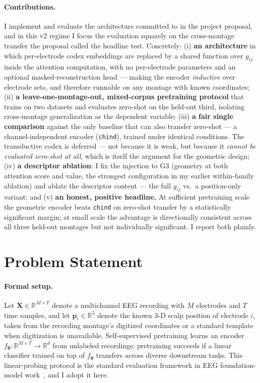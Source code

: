 \documentclass[11pt]{article}
\begin{document}
\paragraph{Contributions.}
I implement and evaluate the architecture committed to in the project
proposal, and in this v2 regime I focus the evaluation squarely on the
cross-montage transfer the proposal called the headline test. Concretely:
(i) \textbf{an architecture} in which per-electrode codex embeddings are
replaced by a shared function over $g_{ij}$ inside the attention
computation, with no per-electrode parameters and an optional
masked-reconstruction head --- making the encoder \emph{inductive} over
electrode sets, and therefore runnable on any montage with known
coordinates;
(ii) \textbf{a leave-one-montage-out, mixed-corpus pretraining protocol}
that trains on two datasets and evaluates zero-shot on the held-out third,
isolating cross-montage generalization as the dependent variable;
(iii) \textbf{a fair single comparison} against the only baseline that can
also transfer zero-shot --- a channel-independent encoder (\texttt{chind}),
trained under identical conditions. The transductive codex is deferred ---
not because it is weak, but because it \emph{cannot be evaluated zero-shot at
all}, which is itself the argument for the geometric design;
(iv) \textbf{a descriptor ablation}: I fix the injection to G3 (geometry at
both attention score and value, the strongest configuration in my earlier
within-family ablation) and ablate the descriptor content --- the full
$g_{ij}$ vs.\ a position-only variant; and
(v) \textbf{an honest, positive headline.} At sufficient pretraining scale
the geometric encoder beats \texttt{chind} on zero-shot transfer by a
statistically significant margin; at small scale the advantage is
directionally consistent across all three held-out montages but not
individually significant. I report both plainly.

\section{Problem Statement}
\label{sec:problem}

\paragraph{Formal setup.}
Let $\mathbf{X} \in \mathbb{R}^{M \times T}$ denote a multichannel EEG
recording with $M$ electrodes and $T$ time samples, and let
$\mathbf{p}_i \in \mathbb{R}^3$ denote the known 3-D scalp position of
electrode $i$, taken from the recording montage's digitized coordinates or a
standard template when digitization is unavailable. Self-supervised
pretraining learns an encoder
$f_{\boldsymbol{\theta}} : \mathbb{R}^{M \times T} \to \mathbb{R}^d$ from
unlabeled recordings; pretraining succeeds if a linear classifier trained on
top of $f_{\boldsymbol{\theta}}$ transfers across diverse downstream tasks.
This linear-probing protocol is the standard evaluation framework in EEG
foundation-model work~\cite{kostas2021bendr, yang2023biot, jiang2024labram,
wang2024eegpt}, and I adopt it here.
\end{document}
